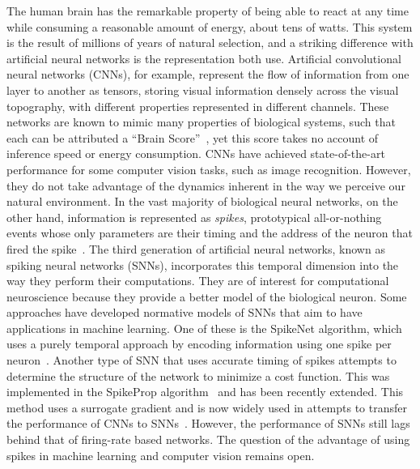 \documentclass[default]{sn-jnl}%
\theoremstyle{thmstyleone}%
\theoremstyle{thmstyletwo}%
\theoremstyle{thmstylethree}%
\begin{document}
The human brain has the remarkable property of being able to react at any time while consuming a reasonable amount of energy, about tens of watts. This system is the result of millions of years of natural selection, and a striking difference with artificial neural networks is the representation both use. Artificial convolutional neural networks (CNNs), for example, represent the flow of information from one layer to another as tensors, storing visual information densely across the visual topography, with different properties represented in different channels. These networks are known to mimic many properties of biological systems, such that each can be attributed a ``Brain Score''~\citep{schrimpf_brain-score_2020}, yet this score takes no account of inference speed or energy consumption. CNNs have achieved state-of-the-art performance for some computer vision tasks, such as image recognition. However, they do not take advantage of the dynamics inherent in the way we perceive our natural environment. In the vast majority of biological neural networks, on the other hand, information is represented as \emph{spikes}, prototypical all-or-nothing events whose only parameters are their timing and the address of the neuron that fired the spike~\citep{paugam-moisy_computing_2012}. The third generation of artificial neural networks, known as spiking neural networks (SNNs), incorporates this temporal dimension into the way they perform their computations. They are of interest for computational neuroscience because they provide a better model of the biological neuron. Some approaches have developed normative models of SNNs that aim to have applications in machine learning. One of these is the SpikeNet algorithm, which uses a purely temporal approach by encoding information using one spike per neuron~\citep{delorme_spikenet_1999}. Another type of SNN that uses accurate timing of spikes attempts to determine the structure of the network to minimize a cost function. This was implemented in the SpikeProp algorithm~\citep{bohte_error-backpropagation_2002} and has been recently extended. This method uses a surrogate gradient and is now widely used in attempts to transfer the performance of CNNs to SNNs~\citep{zenke_remarkable_2021}. However, the performance of SNNs still lags behind that of firing-rate based networks. The question of the advantage of using spikes in machine learning and computer vision remains open.
\end{document}
